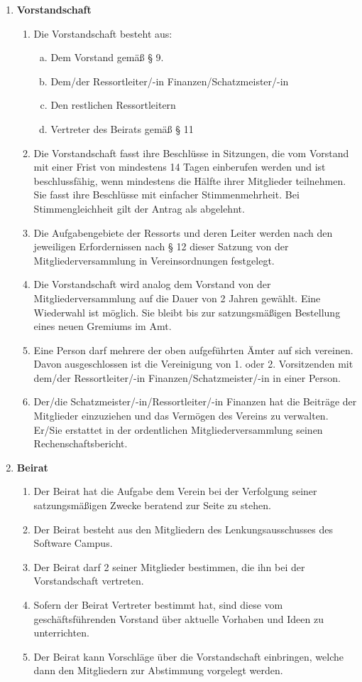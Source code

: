 \documentclass{article}
\begin{document}
\begin{enumerate}[§ 1.]
\item \textsf{\textbf{Vorstandschaft}}
	\begin{enumerate}[1.]
	\item Die Vorstandschaft besteht aus:
		\begin{enumerate}[a.]
		\item Dem Vorstand gemäß § 9.
		\item Dem/der Ressortleiter/-in Finanzen/Schatzmeister/-in
		\item Den restlichen Ressortleitern
		\item Vertreter des Beirats gemäß § 11
		\end{enumerate}
	\item Die Vorstandschaft fasst ihre Beschlüsse in Sitzungen, die vom Vorstand mit einer
Frist von mindestens 14 Tagen einberufen werden und ist beschlussfähig, wenn
mindestens die Hälfte ihrer Mitglieder teilnehmen. Sie fasst ihre Beschlüsse mit
einfacher Stimmenmehrheit. Bei Stimmengleichheit gilt der Antrag als abgelehnt.
	\item Die Aufgabengebiete der Ressorts und deren Leiter werden nach den jeweiligen
Erfordernissen nach § 12 dieser Satzung von der Mitgliederversammlung in
Vereinsordnungen festgelegt.
	\item Die Vorstandschaft wird analog dem Vorstand von der Mitgliederversammlung auf
die Dauer von 2 Jahren gewählt. Eine Wiederwahl ist möglich. Sie bleibt bis zur
satzungsmäßigen Bestellung eines neuen Gremiums im Amt.
	\item Eine Person darf mehrere der oben aufgeführten Ämter auf sich vereinen. Davon
ausgeschlossen ist die Vereinigung von 1. oder 2. Vorsitzenden mit dem/der
Ressortleiter/-in Finanzen/Schatzmeister/-in in einer Person.
	\item Der/die Schatzmeister/-in/Ressortleiter/-in Finanzen hat die Beiträge der Mitglieder
einzuziehen und das Vermögen des Vereins zu verwalten. Er/Sie erstattet in der
ordentlichen Mitgliederversammlung seinen Rechenschaftsbericht.
	\end{enumerate}

\item \textsf{\textbf{Beirat}}
	\begin{enumerate}[1.]
	\item Der Beirat hat die Aufgabe dem Verein bei der Verfolgung seiner
satzungsmäßigen Zwecke beratend zur Seite zu stehen.
	\item Der Beirat besteht aus den Mitgliedern des Lenkungsausschusses des Software
Campus.
	\item Der Beirat darf 2 seiner Mitglieder bestimmen, die ihn bei der Vorstandschaft
vertreten.
	\item Sofern der Beirat Vertreter bestimmt hat, sind diese vom geschäftsführenden
Vorstand über aktuelle Vorhaben und Ideen zu unterrichten.
	\item Der Beirat kann Vorschläge über die Vorstandschaft einbringen, welche dann den
Mitgliedern zur Abstimmung vorgelegt werden.
	\end{enumerate}


\end{enumerate}
\end{document}
